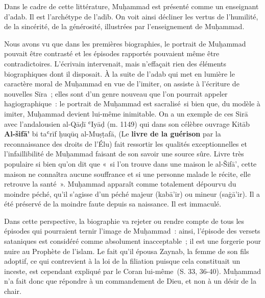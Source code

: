Dans le cadre de cette littérature, Muḥammad est présenté comme un
enseignant d'adab. Il est l'archétype de l'adīb. On voit ainsi décliner
les vertus de l'humilité, de la sincérité, de la générosité, illustrées
par l'enseignement de Muḥammad.


Nous avons vu que dans les premières biographies, le portrait de
Muḥammad pouvait être contrasté et les épisodes rapportés pouvaient même
être contradictoires. L'écrivain intervenait, mais n'effaçait rien des
éléments biographiques dont il disposait. À la suite de l'adab qui met
en lumière le caractère moral de Muḥammad en vue de l'imiter, on assiste
à l'écriture de nouvelles Sīra~; elles sont d'un genre nouveau que l'on
pourrait appeler hagiographique~: le portrait de Muḥammad est
sacralisé~si bien que, du modèle à imiter, Muḥammad devient lui-même
inimitable. On a un exemple de ces Sirā avec l'andalousien al-Qāḍī ʿIyāḍ
(m. 1149) qui dans son célèbre ouvrage Kitāb \textbf{Al-šifā'} bi taʿrīf
ḥuqūq al-Muṣṭafā, (Le \textbf{livre de la guérison} par la
reconnaissance des droits de l'Élu) fait ressortir les qualités
exceptionnelles et l'infaillibilité de Muḥammad faisant de son savoir
une source sûre. Livre très populaire si bien qu'on dit que «~si l'on
trouve dans une maison le al-Šifā', cette maison ne connaîtra aucune
souffrance et si une personne malade le récite, elle retrouve la
santé~». Muḥammad apparaît comme totalement dépourvu du moindre péché,
qu'il s'agisse d'un péché majeur (kabā'ir) ou mineur (saġā'ir). Il a été
préservé de la moindre faute depuis sa naissance. Il est immaculé.

Dans cette perspective, la biographie va rejeter ou rendre compte de
tous les épisodes qui pourraient ternir l'image de Muḥammad~: ainsi,
l'épisode des versets sataniques est considéré comme absolument
inacceptable~; il est une forgerie pour nuire au Prophète de l'islam. Le
fait qu'il épousa Zaynab, la femme de son fils adoptif, ce qui
contrevient à la loi de la filiation puisque cela constituait un
inceste, est cependant expliqué par le Coran lui-même~(S. 33, 36-40).
Muḥammad n'a fait donc que répondre à un commandement de Dieu, et non à
un désir de la chair.

